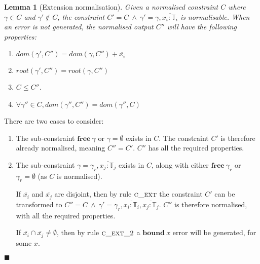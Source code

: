\documentclass[preprint]{sigplanconf}
\newtheorem{lem}{Lemma}
\newcommand{\cand}{\:\wedge\:}
\newcommand{\free}[1]{\mathbf{free}\:#1}
\newcommand{\tinf}{\mathbb{T}}
\newcommand{\qed}{$\blacksquare$}
\newenvironment{proof}{\vspace{1ex}\noindent{\bf Proof}\hspace{0.5em}}
  {\hfill\qed\vspace{1ex}}
\begin{document}

\begin{lem}[Extension normalisation]
\label{lem:norm_ext}
Given a normalised constraint $C$ where $\gamma \in C$ and $\gamma' \notin C$, 
the constraint $C' = C \cand \gamma' = \gamma, \overline{x_i : \tinf_i}$
is normalisable. When an error is not generated, the normalised output
$C''$ will have the following properties:

\begin{enumerate}
\item $dom(\gamma', C'') = dom(\gamma, C'') + \overline{x_i}$
\item $root(\gamma', C'') = root(\gamma, C'')$
\item $C \leq C''$.
\item $\forall \gamma'' \in C, dom(\gamma'', C'') = dom(\gamma'', C)$
\end{enumerate}

\end{lem}
\begin{proof}
There are two cases to consider:

\begin{enumerate}
\item The sub-constraint $\free{\gamma}$ or $\gamma = \emptyset$ exists in $C$.
The constraint $C'$ is therefore already normalised, meaning $C'' = C'$.
$C''$ has all the required properties.

\item The sub-constraint $\gamma = \gamma_r, \overline{x_j : \tinf_j}$ exists
in $C$, along with either $\free{\gamma_r}$ or $\gamma_r = \emptyset$ (as
$C$ is normalised).

If $\overline{x_i}$ and $\overline{x_j}$ are disjoint, then by rule
$\textsc{c\_ext}$ the constraint $C'$ can be transformed to
$C'' = C \cand \gamma' = \gamma_r, \overline{x_i : \tinf_i}, \overline{x_j : \tinf_j}$.
$C''$ is therefore normalised, with all the required properties.

If $\overline{x_i} \cap \overline{x_j} \neq \emptyset$, then by rule
$\textsc{c\_ext\_2}$ a $\mathbf{bound}\:x$ error will be generated, for
some $x$.
\end{enumerate}
\end{proof}


\end{document}
